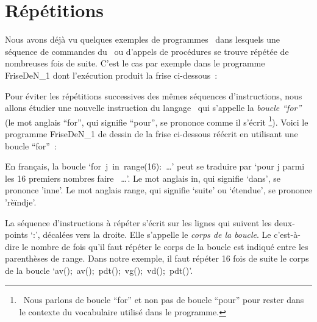 \section{Répétitions}

Nous avons déjà vu quelques exemples de programmes \python\ dans lesquels une
séquence de commandes du \robot\ ou d'appels de procédures se trouve répétée de
nombreuses fois de suite. C'est le cas par exemple dans le programme {\idt FriseDeN\_1}
dont l'exécution produit la frise ci-dessous~:

\vspace*{8mm}%
\noindent{}
\vspace*{-1cm}%


Pour éviter les répétitions successives des mêmes séquences d'ins\-truc\-tions,
nous allons étudier une nouvelle instruction du langage \python\ qui s'appelle la
{\em boucle ``for''} (le mot anglais ``for'', qui signifie ``pour'',
se prononce comme il s'écrit%
\footnote{\ Nous parlons de boucle ``for'' et non pas de boucle ``pour'' pour rester dans le
contexte du vocabulaire utilisé dans le programme.}). Voici le
programme {\idt FriseDeN\_1} de dessin de la frise ci-dessous
réécrit en utilisant une boucle ``for''~:

\vspace*{8mm}%
\noindent{}
\vspace*{-1cm}%
\label{prog:FriseDeN_2}


\noindent En français, la boucle `{\mcl for}\ {\idt j}\ {\mcl in}\ {\idt range(16):}\ \ldots'
peut se traduire par  `pour j parmi les 16 premiers nombres faire \ \ldots'. Le mot anglais {\mcl in},
qui signifie `dans', se prononce 'inne'. Le mot anglais {\idt range}, qui signifie
`suite' ou `étendue', se prononce 'rèïndje'.

La séquence d'instructions à répéter s'écrit sur les lignes qui suivent les deux-points `{\idt :}',
décalées vers la droite. Elle s'appelle le
{\em corps de la boucle}. Le  c'est-à-dire le
nombre de fois qu'il faut répéter le corps de la boucle est indiqué
entre les parenthèses de {\idt range}. Dans notre exemple, il faut répéter 16 fois
de suite le corps de la boucle  `{\idt  av();\ av();\ pdt();\ vg();\ vd();\ pdt()}'.

